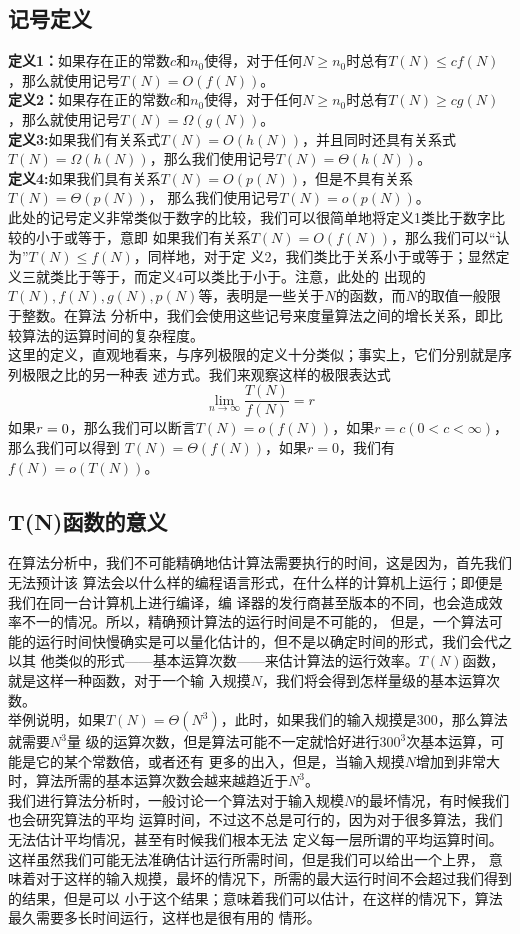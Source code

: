 \documentclass[a4paper,12pt]{ctexart}
\begin{document}
	\subsection{记号定义}
		\textbf{定义1：}如果存在正的常数$c$和$n_0$使得，对于任何$N\geqslant n_0$时总有$T(N)
		\leqslant c f(N)$，那么就使用记号$T(N)=O(f(N))$。\\
		\indent
		\textbf{定义2：}如果存在正的常数$c$和$n_0$使得，对于任何$N\geqslant n_0$时总有$T(N)
		\geqslant cg(N)$，那么就使用记号$T(N)=\Omega(g(N))$。\\
		\indent
		\textbf{定义3:}如果我们有关系式$T(N)=O(h(N))$，并且同时还具有关系式$T(N)=
		\Omega(h(N))$，那么我们使用记号$T(N)=\Theta(h(N))$。\\
		\indent
		\textbf{定义4:}如果我们具有关系$T(N)=O(p(N))$，但是不具有关系$T(N)=\Theta(p(N))$，
		那么我们使用记号$T(N)=o(p(N))$。\\
		\indent
		此处的记号定义非常类似于数字的比较，我们可以很简单地将定义1类比于数字比较的小于或等于，意即
		如果我们有关系$T(N)=O(f(N))$，那么我们可以“认为”$T(N)\leqslant f(N)$，同样地，对于定
		义2，我们类比于关系小于或等于；显然定义三就类比于等于，而定义4可以类比于小于。注意，此处的
		出现的$T(N),f(N),g(N),p(N)$等，表明是一些关于$N$的函数，而$N$的取值一般限于整数。在算法
		分析中，我们会使用这些记号来度量算法之间的增长关系，即比较算法的运算时间的复杂程度。\\
		\indent
		这里的定义，直观地看来，与序列极限的定义十分类似；事实上，它们分别就是序列极限之比的另一种表
		述方式。我们来观察这样的极限表达式
		$$
		\lim_{n \rightarrow \infty}\frac{T(N)}{f(N)}=r
		$$
		如果$r\\=0$，那么我们可以断言$T(N)=o(f(N))$，如果$r=c(0<c<\infty)$，那么我们可以得到
		$T(N)=\Theta(f(N))$，如果$r=0$，我们有$f(N)=o(T(N))$。
	\subsection{T(N)函数的意义}
		\indent 在算法分析中，我们不可能精确地估计算法需要执行的时间，这是因为，首先我们无法预计该
		算法会以什么样的编程语言形式，在什么样的计算机上运行；即便是我们在同一台计算机上进行编译，编
		译器的发行商甚至版本的不同，也会造成效率不一的情况。所以，精确预计算法的运行时间是不可能的，
		但是，一个算法可能的运行时间快慢确实是可以量化估计的，但不是以确定时间的形式，我们会代之以其
		他类似的形式——基本运算次数——来估计算法的运行效率。$T(N)$函数，就是这样一种函数，对于一个输
		入规摸$N$，我们将会得到怎样量级的基本运算次数。\\
		\indent
		举例说明，如果$T(N)=\Theta(N^3)$，此时，如果我们的输入规摸是300，那么算法就需要$N^3$量
		级的运算次数，但是算法可能不一定就恰好进行$300^3$次基本运算，可能是它的某个常数倍，或者还有
		更多的出入，但是，当输入规摸$N$增加到非常大时，算法所需的基本运算次数会越来越趋近于$N^3$。
		\\
		\indent
		我们进行算法分析时，一般讨论一个算法对于输入规模$N$的最坏情况，有时候我们也会研究算法的平均
		运算时间，不过这不总是可行的，因为对于很多算法，我们无法估计平均情况，甚至有时候我们根本无法
		定义每一层所谓的平均运算时间。这样虽然我们可能无法准确估计运行所需时间，但是我们可以给出一个上界，
		意味着对于这样的输入规摸，最坏的情况下，所需的最大运行时间不会超过我们得到的结果，但是可以
		小于这个结果；意味着我们可以估计，在这样的情况下，算法最久需要多长时间运行，这样也是很有用的
		情形。
\end{document}
